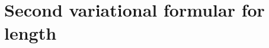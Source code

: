 \documentclass[letter-paper]{tufte-book}
\begin{document}

\section{Second variational formular for length}










\mainmatter




%


\end{document}
